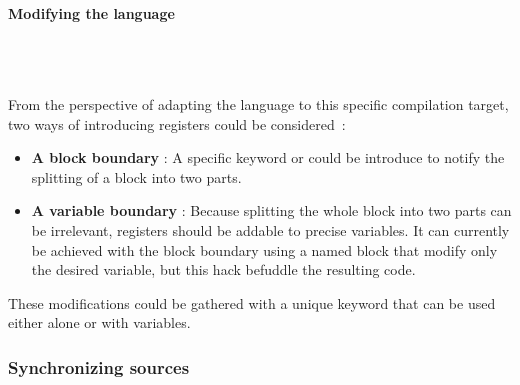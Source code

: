 \documentclass[10pt,a4paper]{article}
\newcommand{\code}{\texttt}
\renewcommand{\indent}{~\\\vspace{-.8cm}}
\newcommand{\pindent}{~\\\indent}
\begin{document}
\paragraph{Modifying the language}\pindent

From the perspective of adapting the language to this specific compilation target, two ways of introducing registers could be considered~:

\begin{itemize}
	\item \textbf{A block boundary} : A specific keyword \code{} or \code{} could be introduce to notify the splitting of a block into two parts.
	\item \textbf{A variable boundary} : Because splitting the whole block into two parts can be irrelevant, registers should be addable to precise variables. It can currently be achieved with the block boundary using a named block that modify only the desired variable, but this hack befuddle the resulting code.
\end{itemize}

These modifications could be gathered with a unique keyword that can be used either alone or with variables.

\subsubsection{Synchronizing sources}
\indent
\end{document}
